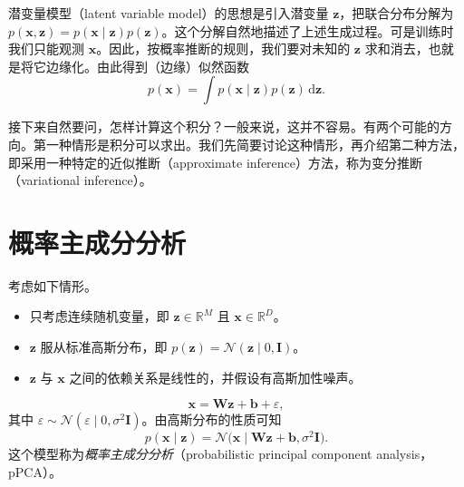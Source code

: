 潜变量模型（latent variable model）的思想是引入潜变量 $\mathbf{z}$，把联合分布分解为 $p(\mathbf{x},\mathbf{z})=p(\mathbf{x}\mid\mathbf{z})p(\mathbf{z})$。这个分解自然地描述了上述生成过程。可是训练时我们只能观测 $\mathbf{x}$。因此，按概率推断的规则，我们要对未知的 $\mathbf{z}$ 求和消去，也就是将它边缘化。由此得到（边缘）似然函数
\begin{equation}
p(\mathbf{x})=\int p(\mathbf{x}\mid\mathbf{z})p(\mathbf{z})\,\mathrm{d}\mathbf{z}.
\tag{5.1}\label{eq:05-01}
\end{equation}

接下来自然要问，怎样计算这个积分？一般来说，这并不容易。有两个可能的方向。第一种情形是积分可以求出。我们先简要讨论这种情形，再介绍第二种方法，即采用一种特定的近似推断（approximate inference）方法，称为变分推断（variational inference）。

\section{概率主成分分析}
\label{sec:ppca}
考虑如下情形。
\begin{itemize}
\item 只考虑连续随机变量，即 $\mathbf{z}\in\mathbb{R}^M$ 且 $\mathbf{x}\in\mathbb{R}^D$。
\item $\mathbf{z}$ 服从标准高斯分布，即 $p(\mathbf{z})=\mathcal{N}(\mathbf{z}\mid 0,\mathbf{I})$。
\item $\mathbf{z}$ 与 $\mathbf{x}$ 之间的依赖关系是线性的，并假设有高斯加性噪声。
\end{itemize}
\begin{equation}
\mathbf{x}=\mathbf{W}\mathbf{z}+\mathbf{b}+\varepsilon,
\tag{5.2}\label{eq:05-02}
\end{equation}
其中 $\varepsilon\sim\mathcal{N}(\varepsilon\mid 0,\sigma^2\mathbf{I})$。由高斯分布的性质可知
\begin{equation}
p(\mathbf{x}\mid\mathbf{z})=\mathcal{N}\bigl(\mathbf{x}\mid\mathbf{W}\mathbf{z}+\mathbf{b},\sigma^2\mathbf{I}\bigr).
\tag{5.3}\label{eq:05-03}
\end{equation}
这个模型称为\emph{概率主成分分析}（probabilistic principal component analysis，pPCA）。

